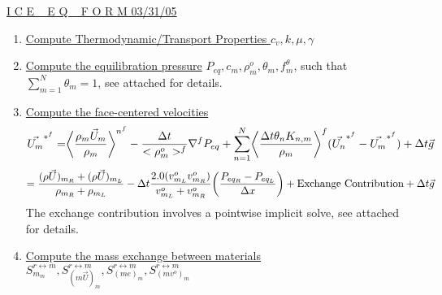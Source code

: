 \documentclass[fleqn]{article}
\newcommand{\SUM}[1]    {\ensuremath{\sum \limits_{{#1}=1}^N }}
\newcommand{\bigS}[1]   {\ensuremath{S^{r \leftrightarrow m}_{#1}}  }
\newcommand{\B}[1]      {\biggr{#1}}
\newcommand{\U}         {{\vec{U}}}
\newcommand{\rhoM}      {\ensuremath{\rho^{o}_m}}
\newcommand{\delt}      {\ensuremath{\Delta{t}} }
\newcommand{\f}         {\ensuremath{f^{\theta}_m} }
\newcommand{\sv}[1]     {\ensuremath{v^o_{m_{#1}} }}
\begin{document}
\setlength{\abovedisplayskip}{0.1in}
\setlength{\mathindent}{0.0in}
\underline{ I C E  ~ E Q ~  F O R M  \hspace{ 0.5in}03/31/05}

\begin{enumerate}
\item \underline{Compute Thermodynamic/Transport Properties
$c_v, k, \mu, \gamma$}

\item \underline{Compute the equilibration pressure}
$P_{eq}, c_m, \rhoM, \theta_m, \f$, such that $\SUM{m}\theta_m = 1$, see attached for details.
\item \underline{Compute the face-centered velocities} 
\[
    \vec{U_m}^{*^{f}} 
    = \B{<} \frac{ \rho_m \U_m }{\rho_m} \B{>}^{n^{f}}
%
    - \frac{ \delt }{< \rhoM >^f} \nabla^{f} P_{eq}
    + \SUM{n} \B{<} \frac{\delt \theta_n K_{n,m}}{\rho_m} \biggl{>}^f(\vec{U_n}^{*^{f}} - \vec{U_m}^{*^{f}})  
    + \delt\vec{g}
\]
\[    
   =\frac{(\rho \U)_{m_R} + (\rho \U)_{m_L}}{\rho_{m_R} + \rho_{m_L}}
%
   -\delt \frac{2.0 (\sv{L} \sv{R})}  {\sv{L} + \sv{R}}  \B{(} \frac{P_{eq_R} - P_{eq_L}}{\Delta x}\B{)}
   + \text{Exchange Contribution}
   + \delt\vec{g}
\]
The exchange contribution involves a pointwise implicit solve, see attached for details.
\item \underline{Compute the mass exchange between materials}
$  \bigS{m_m},  \bigS{(m \U)_m}, \bigS{(m e)_m}, \bigS{(m v^o)_m }$


\end{enumerate}
\end{document}
